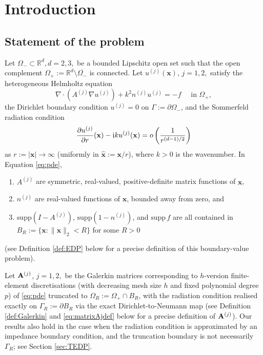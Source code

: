 \documentclass[10pt]{article}%
\numberwithin{equation}{section}
\newcommand{\beq}{\begin{equation}}
\newcommand{\eeq}{\end{equation}}
\newcommand{\ben}{\begin{enumerate}}
\newcommand{\een}{\end{enumerate}}
\newcommand{\bx}{\mathbf{x}}
\newcommand{\supp}{\mathrm{supp}}
\newcommand{\ri}{{\rm i}}
\newcommand{\Rea}{\mathbb{R}}
\newcommand{\pdiff}[2]{\frac{\partial #1}{\partial #2}}
\newcommand{\Oi}{{\Omega_-}}
\newcommand{\Oe}{{\Omega_+}}
\newcommand{\tendi}{\rightarrow \infty}
\newcommand{\tin}{\text{ in }}
\newcommand{\hatx}{\widehat{\bx}}
\newcommand{\matrixAj}{{\bf A}^{(j)}}
\newcommand{\coeffAj}{A^{(j)}}
\newcommand{\coeffnj}{n^{(j)}}
\newcommand{\solj}{u^{(j)}}
\begin{document}



\section{Introduction}\label{sec:intro}

\subsection{Statement of the problem}\label{sec:problem}

Let $\Oi \subset \Rea^d, d=2,3, $ be a bounded Lipschitz open set such that the open complement $\Oe:= \Rea^d\setminus\overline{\Oi}$ is connected. 
Let $\solj(\bx)$, $j=1,2,$ satisfy 
the heterogeneous Helmholtz equation
\beq\label{eq:pde}
\nabla\cdot(\coeffAj \nabla\solj ) + k^2 \coeffnj \solj =-f \quad \tin \Oe,
\eeq
the Dirichlet boundary condition $u^{(j)}=0$ on $\Gamma:= \partial \Oi$, and the Sommerfeld radiation condition 
\beq\label{eq:src}
\pdiff{u^{(j)}}{r}(\bx) - \ri k u^{(j)}(\bx) = o \left( \frac{1}{r^{(d-1)/2}}\right)
\eeq
as $r:= |\bx|\tendi$ (uniformly in $\hatx:= \bx/r$),
where $k>0$ is the wavenumber. In Equation \eqref{eq:pde},
\ben
\item $\coeffAj$ are symmetric, real-valued, positive-definite  matrix functions of $\bx$, 
\item $\coeffnj$ are real-valued functions of $\bx$, bounded away from zero, and 
\item $\supp(I-\coeffAj)$, $\supp(1-\coeffnj)$, and $\supp\, f$ are all %
contained in $B_R:= \{\bx : \|\bx\|_2<R\}$ for some $R>0$
\een
(see Definition \ref{def:EDP} below for a precise definition of this boundary-value problem).

Let $\matrixAj$, $j=1,2,$ be the Galerkin matrices corresponding to $h$-version finite-element discretisations (with decreasing mesh size $h$ and fixed polynomial degree $p$)
of \eqref{eq:pde} truncated to $\Omega_R:= \Oe \cap B_R$, with the radiation condition realised exactly on $\Gamma_R:=\partial B_R$ via the exact Dirichlet-to-Neumann map (see Definition \ref{def:Galerkin} and \eqref{eq:matrixAjdef} below for a precise definition of $\matrixAj$). Our results also hold in the case when the radiation condition is approximated by an impedance boundary condition, and the truncation boundary is not necessarily $\Gamma_R$; see Section \ref{sec:TEDP}.
 
\end{document}
